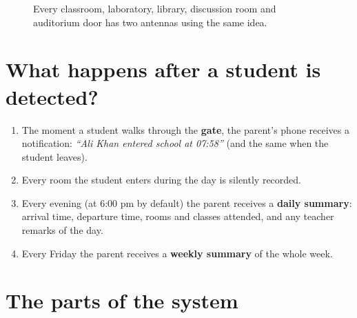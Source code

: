 \begin{figure}[H]
\centering
{}
\caption{Every classroom, laboratory, library, discussion room and
auditorium door has two antennas using the same idea.}
\end{figure}

\section{What happens after a student is detected?}

\begin{enumerate}[itemsep=2pt]
  \item The moment a student walks through the \textbf{gate}, the
        parent's phone receives a notification: \emph{``Ali Khan entered
        school at 07:58''} (and the same when the student leaves).
  \item Every room the student enters during the day is silently
        recorded.
  \item Every evening (at 6:00 pm by default) the parent receives a
        \textbf{daily summary}: arrival time, departure time, rooms and
        classes attended, and any teacher remarks of the day.
  \item Every Friday the parent receives a \textbf{weekly summary} of
        the whole week.
\end{enumerate}

\section{The parts of the system}

